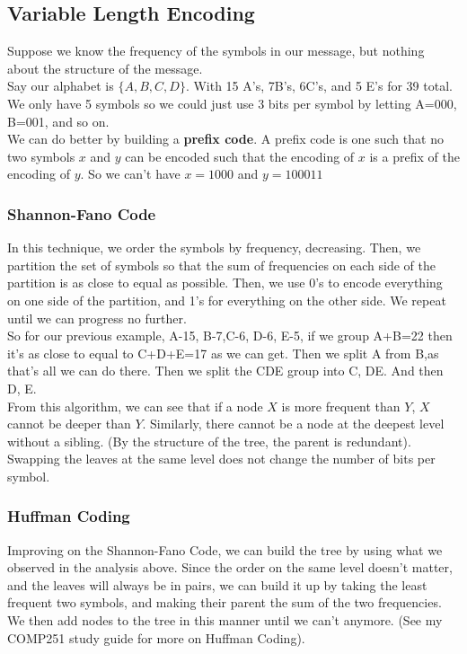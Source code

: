 \documentclass[12pt]{article}
\theoremstyle{definition}
\begin{document}
\subsection{Variable Length Encoding}
Suppose we know the frequency of the symbols in our message, but nothing about the structure of the message. 
\\ \linebreak
Say our alphabet is $\{A, B, C, D\}$. With 15 A's, 7B's, 6C's, and 5 E's for 39 total. We only have 5 symbols so we could just use 3 bits per symbol by letting A=000, B=001, and so on. 
\\ \linebreak
We can do better by building a \textbf{prefix code}. A prefix code is one such that no two symbols $x$ and $y$ can be encoded such that the encoding of $x$ is a prefix of the encoding of $y$. So we can't have $x=1000$ and $y=100011$
\subsubsection{Shannon-Fano Code}
In this technique, we order the symbols by frequency, decreasing. Then, we partition the set of symbols so that the sum of frequencies on each side of the partition is as close to equal as possible. Then, we use 0's to encode everything on one side of the partition, and 1's for everything on the other side. We repeat until we can progress no further.
\\ \linebreak
So for our previous example, A-15, B-7,C-6, D-6, E-5, if we group A+B=22 then it's as close to equal to C+D+E=17 as we can get. Then we split A from B,as that's all we can do there. Then we split the CDE group into C, DE. And then D, E. 
\\ \linebreak
From this algorithm, we can see that if a node $X$ is more frequent than $Y$, $X$ cannot be deeper than $Y$. Similarly, there cannot be a node at the deepest level without a sibling. (By the structure of the tree, the parent is redundant). Swapping the leaves at the same level does not change the number of bits per symbol.

\subsubsection{Huffman Coding}
Improving on the Shannon-Fano Code, we can build the tree by using what we observed in the analysis above. Since the order on the same level doesn't matter, and the leaves will always be in pairs, we can build it up by taking the least frequent two symbols, and making their parent the sum of the two frequencies. We then add nodes to the tree in this manner until we can't anymore. (See my COMP251 study guide for more on Huffman Coding).
\end{document}
